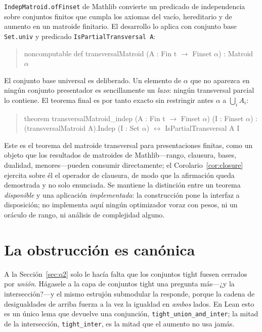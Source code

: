 \documentclass[11pt]{article}
\newcommand{\lean}[1]{\texttt{#1}}
\begin{document}
\lean{IndepMatroid.ofFinset} de Mathlib convierte un predicado de independencia sobre conjuntos
finitos que cumpla los axiomas del vacío, hereditario y de aumento en un matroide finitario. El
desarrollo lo aplica con conjunto base \lean{Set.univ} y predicado \lean{IsPartialTransversal A}:
\begin{quote}\ttfamily\small\noindent
noncomputable def transversalMatroid (A : Fin t $\to$ Finset $\alpha$) : Matroid $\alpha$
\end{quote}
El conjunto base universal es deliberado. Un elemento de $\alpha$ que no aparezca en ningún conjunto
presentador es sencillamente un \emph{lazo}: ningún transversal parcial lo contiene. El teorema
final es por tanto exacto sin restringir antes $\alpha$ a $\bigcup_i A_i$:
\begin{quote}\ttfamily\small\noindent
theorem transversalMatroid\_indep (A : Fin t $\to$ Finset $\alpha$) (I : Finset $\alpha$) :\\
\hspace*{1em}(transversalMatroid A).Indep (I : Set $\alpha$) $\leftrightarrow$ IsPartialTransversal A I
\end{quote}
Este es el teorema del matroide transversal para presentaciones finitas, como un objeto que los
resultados de matroides de Mathlib---rango, clausura, bases, dualidad, menores---pueden consumir
directamente; el Corolario~\ref{cor:closure} ejercita sobre él el operador de clausura, de modo que
la afirmación queda demostrada y no solo enunciada. Se mantiene la distinción entre un teorema
\emph{disponible} y una aplicación \emph{implementada}: la construcción pone la interfaz a
disposición; no implementa aquí ningún optimizador voraz con pesos, ni un oráculo de rango, ni
análisis de complejidad alguno.

\section{La obstrucción es canónica}\label{sec:canonical}

A la Sección~\ref{sec:q2} solo le hacía falta que los conjuntos tight fuesen cerrados por
\emph{unión}. Hágasele a la capa de conjuntos tight una pregunta más---¿y la intersección?---y el
mismo estrujón submodular la responde, porque la cadena de desigualdades de arriba fuerza a la vez
la igualdad en \emph{ambos} lados. En Lean esto es un único lema que devuelve una conjunción,
\lean{tight\_union\_and\_inter}; la mitad de la intersección, \lean{tight\_inter}, es la mitad que
el aumento no usa jamás.
\end{document}
